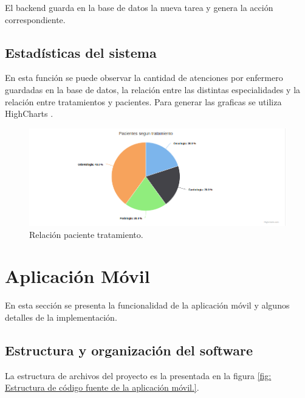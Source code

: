 El backend guarda en la base de datos la nueva tarea y genera la acción correspondiente.

\subsection{Estadísticas del sistema}

En esta función se puede observar la cantidad de atenciones por enfermero guardadas en la base de datos, la relación entre las distintas especialidades y la relación entre tratamientos y pacientes. Para generar las graficas se utiliza HighCharts \citep{WEBSITE:33}. 
\begin{figure}[ht]
	\centering
	\includegraphics[scale=.40]{./Figures/web/pacientes-Tratamiento.png}
	\caption{Relación paciente tratamiento.}
	\label{fig:Relación paciente tratamiento.}
\end{figure} 


\pagebreak
\section{Aplicación Móvil}
En esta sección se presenta la funcionalidad de la aplicación móvil y algunos detalles de la implementación.

\subsection{Estructura y organización del software}
La estructura de archivos del proyecto es la presentada en la figura \ref{fig: Estructura de código fuente de la aplicación móvil.}.

